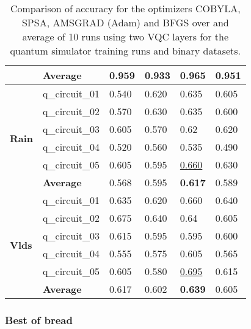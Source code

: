 \begin{table}[!h]
\begin{tabular}{p{}p{}|p{}p{}p{}p{}}
		\cline{2-6} 
		                        & \textbf{Average}      & 0.959  & 0.933 & \textbf{0.965}    & 0.951 \\
		\hline 
		\multirow{6}{*}{\textbf{Rain}}   & q\_circuit\_01 & 0.540  & 0.620 & 0.635    & 0.605 \\
		                        & q\_circuit\_02 & 0.570  & 0.630 & 0.635    & 0.600 \\
		                        & q\_circuit\_03 & 0.605  & 0.570 & 0.62     & 0.620 \\
		                        & q\_circuit\_04 & 0.520  & 0.560 & 0.535    & 0.490 \\
		                        & q\_circuit\_05 & 0.605  & 0.595 & \underline{0.660}    & 0.630 \\
		\cline{2-6} 
		                        & \textbf{Average}      & 0.568  & 0.595 & \textbf{0.617}    & 0.589 \\
		\hline 
		\multirow{6}{*}{\textbf{Vlds}}   & q\_circuit\_01 & 0.635  & 0.620 & 0.660    & 0.640 \\
		                        & q\_circuit\_02 & 0.675  & 0.640 & 0.64     & 0.605 \\
		                        & q\_circuit\_03 & 0.615  & 0.595 & 0.595    & 0.600 \\
		                        & q\_circuit\_04 & 0.555  & 0.575 & 0.605    & 0.565 \\
		                        & q\_circuit\_05 & 0.605  & 0.580 & \underline{0.695}    & 0.615 \\
		\cline{2-6} 
		                        & \textbf{Average}      & 0.617  & 0.602 & \textbf{0.639}    & 0.605 \\
		\hline
	\end{tabular}
	\caption{Comparison of accuracy for the optimizers COBYLA, SPSA, AMSGRAD (Adam) and BFGS over and average of 10 runs using two VQC layers for the quantum simulator training runs and binary datasets.}
	\label{table:accuracy_comparison_all_dataset_and_optimizers_training_runs}
\end{table}

















\subsubsection{Best of bread}


